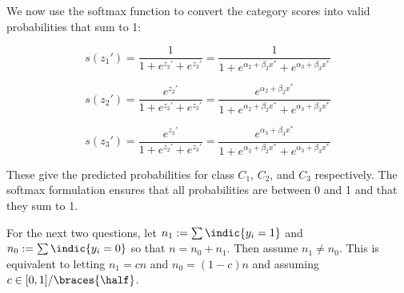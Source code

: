 \documentclass[12pt]{article}
\begin{document}
\begin{enumerate}
We now use the softmax function to convert the category scores into valid probabilities that sum to 1:

\[
s(z_1') = \frac{1}{1 + e^{z_2'} + e^{z_3'}} = \frac{1}{1 + e^{\alpha_2 + \beta_2 x^*} + e^{\alpha_3 + \beta_3 x^*}}
\]

\[
s(z_2') = \frac{e^{z_2'}}{1 + e^{z_2'} + e^{z_3'}} = \frac{e^{\alpha_2 + \beta_2 x^*}}{1 + e^{\alpha_2 + \beta_2 x^*} + e^{\alpha_3 + \beta_3 x^*}}
\]

\[
s(z_3') = \frac{e^{z_3'}}{1 + e^{z_2'} + e^{z_3'}} = \frac{e^{\alpha_3 + \beta_3 x^*}}{1 + e^{\alpha_2 + \beta_2 x^*} + e^{\alpha_3 + \beta_3 x^*}}
\]


These give the predicted probabilities for class $C_1$, $C_2$, and $C_3$ respectively.  
The softmax formulation ensures that all probabilities are between 0 and 1 and that they sum to 1.




For the next two questions, let $n_1 := \sum \indic{y_i = 1}$ and $n_0 := \sum \indic{y_i = 0}$ so that $n = n_0 + n_1$. Then assume $n_1 \neq n_0$. This is equivalent to letting $n_1 = cn$ and $n_0 = (1-c)n$ and assuming $c \in [0,1]/\braces{\half}$.






\end{enumerate}


\end{document}
